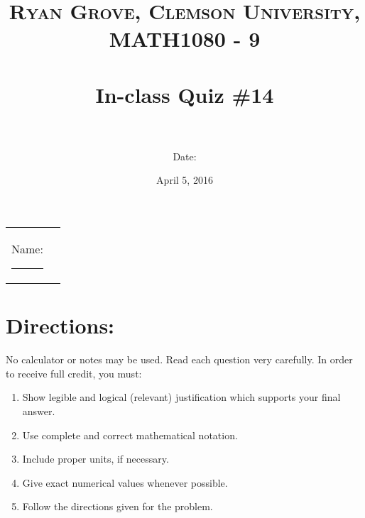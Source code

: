 \documentclass[paper=a4, fontsize=11pt]{scrartcl} %
\title{	
\normalfont \normalsize 
\textsc{Ryan Grove, Clemson University, MATH1080 - 9} \\ [25pt] %
\horrule{0.5pt} \\[0.4cm] %
\huge In-class Quiz \#14 \\ %
\horrule{2pt} \\[0.5cm] %
}
\author{Date:} %
\date{\normalsize April 5, 2016} %
\numberwithin{equation}{section} %
\numberwithin{figure}{section} %
\numberwithin{table}{section} %
\begin{document}
\maketitle %

\begin{flushleft}
\begin{tabular}{l l}
Name: \rule{3.2in}{.01cm}  & {}%
\end{tabular}
\end{flushleft}


\section*{\textbf{Directions:}}

No calculator or notes may be used.  Read each question very carefully.  In order to receive full credit, you must:
\begin{enumerate}
\item Show legible and logical (relevant) justification which supports your final answer.
\item Use complete and correct mathematical notation.
\item Include proper units, if necessary.
\item Give exact numerical values whenever possible.
\item Follow the directions given for the problem.
\end{enumerate}
\vspace{.1in}

\newpage
\end{document}
